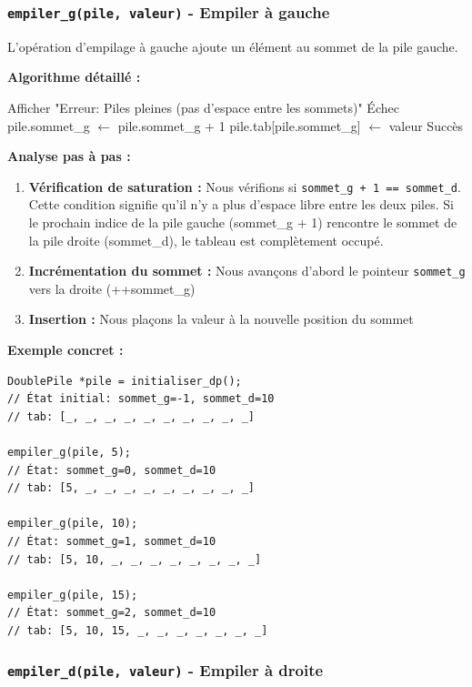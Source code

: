 \documentclass[a4paper, 11pt]{article}
\begin{document}
\subsubsection*{\texttt{empiler\_g(pile, valeur)} - Empiler à gauche}

L'opération d'empilage à gauche ajoute un élément au sommet de la pile gauche.

\textbf{Algorithme détaillé :}
\begin{algorithmic}
    \State Afficher "Erreur: Piles pleines (pas d'espace entre les sommets)"
    \State \Return Échec
\Else
    \State pile.sommet\_g $\leftarrow$ pile.sommet\_g + 1
    \State pile.tab[pile.sommet\_g] $\leftarrow$ valeur
    \State \Return Succès
\EndIf
\end{algorithmic}

\textbf{Analyse pas à pas :}
\begin{enumerate}
    \item \textbf{Vérification de saturation :} Nous vérifions si \texttt{sommet\_g + 1 == sommet\_d}. Cette condition signifie qu'il n'y a plus d'espace libre entre les deux piles. Si le prochain indice de la pile gauche (sommet\_g + 1) rencontre le sommet de la pile droite (sommet\_d), le tableau est complètement occupé.
    \item \textbf{Incrémentation du sommet :} Nous avançons d'abord le pointeur \texttt{sommet\_g} vers la droite (++sommet\_g)
    \item \textbf{Insertion :} Nous plaçons la valeur à la nouvelle position du sommet
\end{enumerate}

\textbf{Exemple concret :}
\begin{lstlisting}
DoublePile *pile = initialiser_dp();
// État initial: sommet_g=-1, sommet_d=10
// tab: [_, _, _, _, _, _, _, _, _, _]

empiler_g(pile, 5);
// État: sommet_g=0, sommet_d=10
// tab: [5, _, _, _, _, _, _, _, _, _]

empiler_g(pile, 10);
// État: sommet_g=1, sommet_d=10
// tab: [5, 10, _, _, _, _, _, _, _, _]

empiler_g(pile, 15);
// État: sommet_g=2, sommet_d=10
// tab: [5, 10, 15, _, _, _, _, _, _, _]
\end{lstlisting}

\subsubsection*{\texttt{empiler\_d(pile, valeur)} - Empiler à droite}
\end{document}
